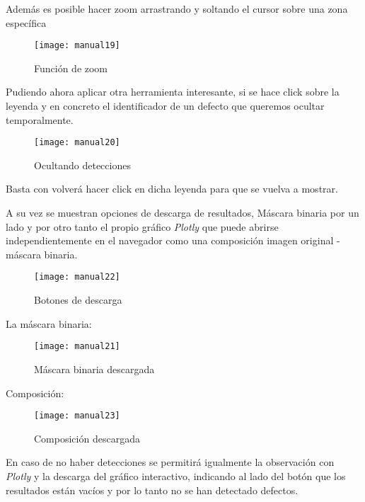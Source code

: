 Además es posible hacer zoom arrastrando y soltando el cursor sobre una zona específica

    \begin{figure}[htb]
	\centering
	\texttt{[image: manual19]}
	\caption[Función de zoom]{Función de zoom}
    \end{figure}

\clearpage

Pudiendo ahora aplicar otra herramienta interesante, si se hace click sobre la leyenda y en concreto el identificador de un defecto que queremos ocultar temporalmente.

    \begin{figure}[htb]
	\centering
	\texttt{[image: manual20]}
	\caption[Ocultando detecciones]{Ocultando detecciones}
    \end{figure}

Basta con volverá hacer click en dicha leyenda para que se vuelva a mostrar.

A su vez se muestran opciones de descarga de resultados, Máscara binaria por un lado y por otro tanto el propio gráfico \emph{Plotly} que puede abrirse independientemente en el navegador como una composición imagen original - máscara binaria.

    \begin{figure}[htb]
	\centering
	\texttt{[image: manual22]}
	\caption[Botones de descarga]{Botones de descarga}
    \end{figure}

\clearpage

La máscara binaria:

    \begin{figure}[htb]
	\centering
	\texttt{[image: manual21]}
	\caption[Máscara binaria descargada]{Máscara binaria descargada}
    \end{figure}

Composición:

    \begin{figure}[htb]
	\centering
	\texttt{[image: manual23]}
	\caption[Composición descargada]{Composición descargada}
    \end{figure}
    
\clearpage

En caso de no haber detecciones se permitirá igualmente la observación con \emph{Plotly} y la descarga del gráfico interactivo, indicando al lado del botón que los resultados están vacíos y por lo tanto no se han detectado defectos.

